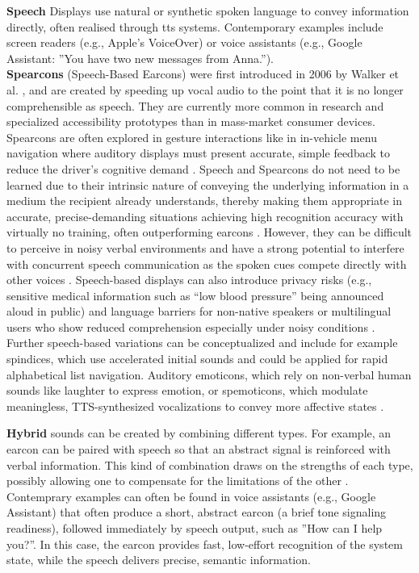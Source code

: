 \textbf{Speech} Displays use natural or synthetic spoken language to convey information directly, often realised through \gls{tts} systems. Contemporary examples include screen readers (e.g., Apple’s VoiceOver) or voice assistants (e.g., Google Assistant: ''You have two new messages from Anna.'').\\ 
\textbf{Spearcons} (Speech-Based Earcons) were first introduced in 2006 by Walker et al. \cite{Walker_06_SpearconsInMenus}, and are created by speeding up vocal audio to the point that it is no longer comprehensible as speech. They are currently more common in research and specialized accessibility prototypes than in mass-market consumer devices. Spearcons are often explored in gesture interactions like in in-vehicle menu navigation \cite{Tabbarah_23_InCarMenuNavAuditorySpearcons} where auditory displays must present accurate, simple feedback to reduce the driver’s cognitive demand \cite{Cooper_15_CognitiveDemandVehicleSpearcon}. Speech and Spearcons do not need to be learned due to their intrinsic nature of conveying the underlying information in a medium the recipient already understands, thereby making them appropriate in accurate, precise-demanding situations achieving high recognition accuracy with virtually no training, often outperforming earcons \cite{Walker_06_SpearconsInMenus}.
However, they can be difficult to perceive in noisy verbal environments and have a strong potential to interfere with concurrent speech communication as the spoken cues compete directly with other voices \cite{Davidson_19_SpearconsInterfereVoice}. Speech-based displays can also introduce privacy risks (e.g., sensitive medical information such as “low blood pressure” being announced aloud in public) and language barriers for non-native speakers or multilingual users who show reduced comprehension especially under noisy conditions \cite{Skoe_19_BilingualismHarderSpeechUnderstandingNoiseEnv}. %
Further speech-based variations can be conceptualized and include for example spindices, which use accelerated initial sounds and could be applied for rapid alphabetical list navigation. Auditory emoticons, which rely on non-verbal human sounds like laughter to express emotion, or spemoticons, which modulate meaningless, TTS-synthesized vocalizations to convey more affective states \cite{Csapo_13_ModernAuditoryDisplayTypesOverview}.


\textbf{Hybrid} sounds can be created by combining different \glspl{type}. For example, an earcon can be paired with speech so that an abstract signal is reinforced with verbal information. This kind of combination draws on the strengths of each type, possibly allowing one to compensate for the limitations of the other \cite{Dingler_08_AuditoryDisplayTypesOverview}. Contemprary examples can often be found in voice assistants (e.g., Google Assistant) that often produce a short, abstract earcon (a brief tone signaling readiness), followed immediately by speech output, such as ''How can I help you?''. In this case, the earcon provides fast, low-effort recognition of the system state, while the speech delivers precise, semantic information.


